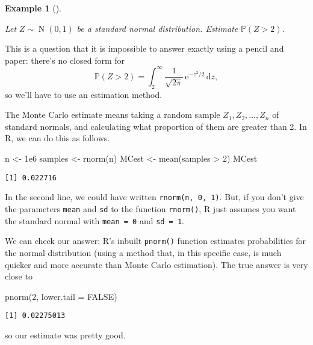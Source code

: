 \documentclass[
  letterpaper,
  DIV=11,
  numbers=noendperiod]{scrreprt}
\newenvironment{Shaded}{\begin{snugshade}}{\end{snugshade}}
\newcommand{\AttributeTok}[1]{\textcolor[rgb]{0.40,0.45,0.13}{#1}}
\newcommand{\ConstantTok}[1]{\textcolor[rgb]{0.56,0.35,0.01}{#1}}
\newcommand{\DecValTok}[1]{\textcolor[rgb]{0.68,0.00,0.00}{#1}}
\newcommand{\FloatTok}[1]{\textcolor[rgb]{0.68,0.00,0.00}{#1}}
\newcommand{\FunctionTok}[1]{\textcolor[rgb]{0.28,0.35,0.67}{#1}}
\newcommand{\NormalTok}[1]{\textcolor[rgb]{0.00,0.23,0.31}{#1}}
\newcommand{\OtherTok}[1]{\textcolor[rgb]{0.00,0.23,0.31}{#1}}
\newcommand{\SpecialCharTok}[1]{\textcolor[rgb]{0.37,0.37,0.37}{#1}}
\theoremstyle{plain}
\theoremstyle{definition}
\theoremstyle{definition}
\newtheorem{example}{Example}[chapter]
\theoremstyle{remark}
\begin{document}
\begin{example}[]\protect\hypertarget{exm-MCprob}{}\label{exm-MCprob}

\emph{Let} \(Z \sim \operatorname{N}(0,1)\) \emph{be a standard normal
distribution. Estimate} \(\mathbb P(Z > 2)\)\emph{.}

This is a question that it is impossible to answer exactly using a
pencil and paper: there's no closed form for
\[ \mathbb P(Z > 2) = \int_2^\infty \frac{1}{\sqrt{2\pi}}\,\mathrm{e}^{-z^2/2}\,\mathrm{d}z , \]
so we'll have to use an estimation method.

The Monte Carlo estimate means taking a random sample
\(Z_1, Z_2, \dots, Z_n\) of standard normals, and calculating what
proportion of them are greater than 2. In R, we can do this as follows.

\begin{Shaded}
\begin{Highlighting}[]
\NormalTok{n }\OtherTok{\textless{}{-}} \FloatTok{1e6}
\NormalTok{samples }\OtherTok{\textless{}{-}} \FunctionTok{rnorm}\NormalTok{(n)}
\NormalTok{MCest }\OtherTok{\textless{}{-}} \FunctionTok{mean}\NormalTok{(samples }\SpecialCharTok{\textgreater{}} \DecValTok{2}\NormalTok{)}
\NormalTok{MCest}
\end{Highlighting}
\end{Shaded}

\begin{verbatim}
[1] 0.022716
\end{verbatim}

In the second line, we could have written \texttt{rnorm(n,\ 0,\ 1)}.
But, if you don't give the parameters \texttt{mean} and \texttt{sd} to
the function \texttt{rnorm()}, R just assumes you want the standard
normal with \texttt{mean\ =\ 0} and \texttt{sd\ =\ 1}.

We can check our answer: R's inbuilt \texttt{pnorm()} function estimates
probabilities for the normal distribution (using a method that, in this
specific case, is much quicker and more accurate than Monte Carlo
estimation). The true answer is very close to

\begin{Shaded}
\begin{Highlighting}[]
\FunctionTok{pnorm}\NormalTok{(}\DecValTok{2}\NormalTok{, }\AttributeTok{lower.tail =} \ConstantTok{FALSE}\NormalTok{)}
\end{Highlighting}
\end{Shaded}

\begin{verbatim}
[1] 0.02275013
\end{verbatim}

so our estimate was pretty good.

\end{example}
\end{document}
